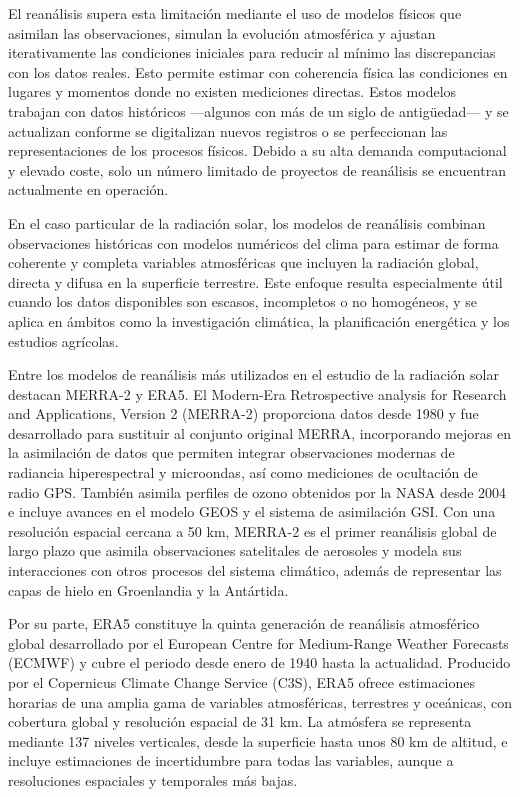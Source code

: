 El reanálisis supera esta limitación mediante el uso de modelos físicos que asimilan las observaciones, simulan la evolución atmosférica y ajustan iterativamente las condiciones iniciales para reducir al mínimo las discrepancias con los datos reales. Esto permite estimar con coherencia física las condiciones en lugares y momentos donde no existen mediciones directas. Estos modelos trabajan con datos históricos —algunos con más de un siglo de antigüedad— y se actualizan conforme se digitalizan nuevos registros o se perfeccionan las representaciones de los procesos físicos. Debido a su alta demanda computacional y elevado coste, solo un número limitado de proyectos de reanálisis se encuentran actualmente en operación.

En el caso particular de la radiación solar, los modelos de reanálisis combinan observaciones históricas con modelos numéricos del clima para estimar de forma coherente y completa variables atmosféricas que incluyen la radiación global, directa y difusa en la superficie terrestre. Este enfoque resulta especialmente útil cuando los datos disponibles son escasos, incompletos o no homogéneos, y se aplica en ámbitos como la investigación climática, la planificación energética y los estudios agrícolas.

Entre los modelos de reanálisis más utilizados en el estudio de la radiación solar destacan MERRA-2 y ERA5. El Modern-Era Retrospective analysis for Research and Applications, Version 2 (MERRA-2) proporciona datos desde 1980 y fue desarrollado para sustituir al conjunto original MERRA, incorporando mejoras en la asimilación de datos que permiten integrar observaciones modernas de radiancia hiperespectral y microondas, así como mediciones de ocultación de radio GPS. También asimila perfiles de ozono obtenidos por la NASA desde 2004 e incluye avances en el modelo GEOS y el sistema de asimilación GSI. Con una resolución espacial cercana a 50 km, MERRA-2 es el primer reanálisis global de largo plazo que asimila observaciones satelitales de aerosoles y modela sus interacciones con otros procesos del sistema climático, además de representar las capas de hielo en Groenlandia y la Antártida.

Por su parte, ERA5 constituye la quinta generación de reanálisis atmosférico global desarrollado por el European Centre for Medium-Range Weather Forecasts (ECMWF) y cubre el periodo desde enero de 1940 hasta la actualidad. Producido por el Copernicus Climate Change Service (C3S), ERA5 ofrece estimaciones horarias de una amplia gama de variables atmosféricas, terrestres y oceánicas, con cobertura global y resolución espacial de 31 km. La atmósfera se representa mediante 137 niveles verticales, desde la superficie hasta unos 80 km de altitud, e incluye estimaciones de incertidumbre para todas las variables, aunque a resoluciones espaciales y temporales más bajas.




